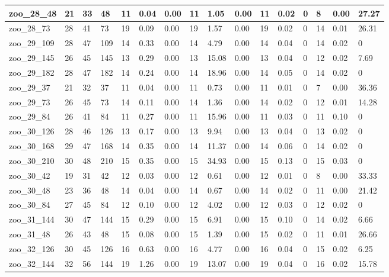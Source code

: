 \begin{landscape}
\begin{longtable}{llllllllllllllll}
zoo\_28\_48 & 21 & 33 & 48 & 11 & 0.04 & 0.00 & 11 & 1.05 & 0.00 & 11 & 0.02 & 0 & 8 & 0.00 & 27.27 \\ \hline 
zoo\_28\_73 & 28 & 41 & 73 & 19 & 0.09 & 0.00 & 19 & 1.57 & 0.00 & 19 & 0.02 & 0 & 14 & 0.01 & 26.31 \\ \hline 
zoo\_29\_109 & 28 & 47 & 109 & 14 & 0.33 & 0.00 & 14 & 4.79 & 0.00 & 14 & 0.04 & 0 & 14 & 0.02 & 0 \\ \hline 
zoo\_29\_145 & 26 & 45 & 145 & 13 & 0.29 & 0.00 & 13 & 15.08 & 0.00 & 13 & 0.04 & 0 & 12 & 0.02 & 7.69 \\ \hline 
zoo\_29\_182 & 28 & 47 & 182 & 14 & 0.24 & 0.00 & 14 & 18.96 & 0.00 & 14 & 0.05 & 0 & 14 & 0.02 & 0 \\ \hline 
zoo\_29\_37 & 21 & 32 & 37 & 11 & 0.04 & 0.00 & 11 & 0.73 & 0.00 & 11 & 0.01 & 0 & 7 & 0.00 & 36.36 \\ \hline 
zoo\_29\_73 & 26 & 45 & 73 & 14 & 0.11 & 0.00 & 14 & 1.36 & 0.00 & 14 & 0.02 & 0 & 12 & 0.01 & 14.28 \\ \hline 
zoo\_29\_84 & 26 & 41 & 84 & 11 & 0.27 & 0.00 & 11 & 15.96 & 0.00 & 11 & 0.03 & 0 & 11 & 0.10 & 0 \\ \hline 
zoo\_30\_126 & 28 & 46 & 126 & 13 & 0.17 & 0.00 & 13 & 9.94 & 0.00 & 13 & 0.04 & 0 & 13 & 0.02 & 0 \\ \hline 
zoo\_30\_168 & 29 & 47 & 168 & 14 & 0.35 & 0.00 & 14 & 11.37 & 0.00 & 14 & 0.06 & 0 & 14 & 0.02 & 0 \\ \hline 
zoo\_30\_210 & 30 & 48 & 210 & 15 & 0.35 & 0.00 & 15 & 34.93 & 0.00 & 15 & 0.13 & 0 & 15 & 0.03 & 0 \\ \hline 
zoo\_30\_42 & 19 & 31 & 42 & 12 & 0.03 & 0.00 & 12 & 0.61 & 0.00 & 12 & 0.01 & 0 & 8 & 0.00 & 33.33 \\ \hline 
zoo\_30\_48 & 23 & 36 & 48 & 14 & 0.04 & 0.00 & 14 & 0.67 & 0.00 & 14 & 0.02 & 0 & 11 & 0.00 & 21.42 \\ \hline 
zoo\_30\_84 & 27 & 45 & 84 & 12 & 0.10 & 0.00 & 12 & 4.02 & 0.00 & 12 & 0.03 & 0 & 12 & 0.02 & 0 \\ \hline 
zoo\_31\_144 & 30 & 47 & 144 & 15 & 0.29 & 0.00 & 15 & 6.91 & 0.00 & 15 & 0.10 & 0 & 14 & 0.02 & 6.66 \\ \hline 
zoo\_31\_48 & 26 & 43 & 48 & 15 & 0.08 & 0.00 & 15 & 1.39 & 0.00 & 15 & 0.02 & 0 & 11 & 0.01 & 26.66 \\ \hline 
zoo\_32\_126 & 30 & 45 & 126 & 16 & 0.63 & 0.00 & 16 & 4.77 & 0.00 & 16 & 0.04 & 0 & 15 & 0.02 & 6.25 \\ \hline 
zoo\_32\_144 & 32 & 56 & 144 & 19 & 1.26 & 0.00 & 19 & 13.07 & 0.00 & 19 & 0.04 & 0 & 16 & 0.02 & 15.78 \\ \hline 

\end{longtable}
\end{landscape}
